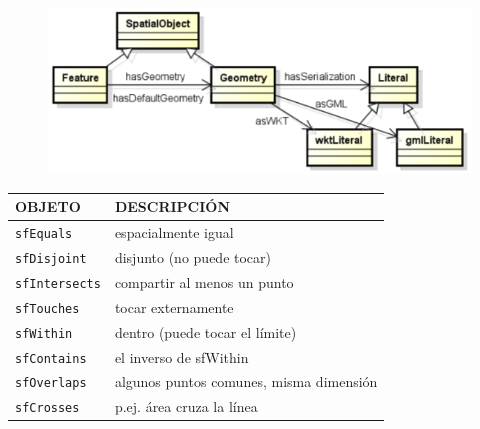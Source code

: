 \begin{figure}[H]
	\centering
	\includegraphics[width=0.7\linewidth]{imagenes/capitulo3/geosparql}
	\caption{}
	\label{fig:geosparql}
\end{figure}


\begin{table}[H]
	\centering
	\begin{tabular}{|l|l|}
		\hline
		\rowcolor[HTML]{EFEFEF} 
		{\textbf{OBJETO}} & { \textbf{DESCRIPCIÓN}} \\ \hline
	\texttt{sfEquals}	&              espacialmente igual           \\ \hline
	\texttt{sfDisjoint}	&        disjunto (no puede tocar)                 \\ \hline
	\texttt{sfIntersects}	&     compartir al menos un punto                    \\ \hline
\texttt{sfTouches} &          tocar externamente               \\ \hline
	\texttt{sfWithin}	&      dentro (puede tocar el límite)                   \\ \hline
\texttt{sfContains} &             el inverso de sfWithin            \\ \hline
	\texttt{sfOverlaps}	&            algunos puntos comunes, misma dimensión             \\ \hline
\texttt{sfCrosses} &         p.ej. área cruza la línea                \\ \hline		
	\end{tabular}
\end{table}

